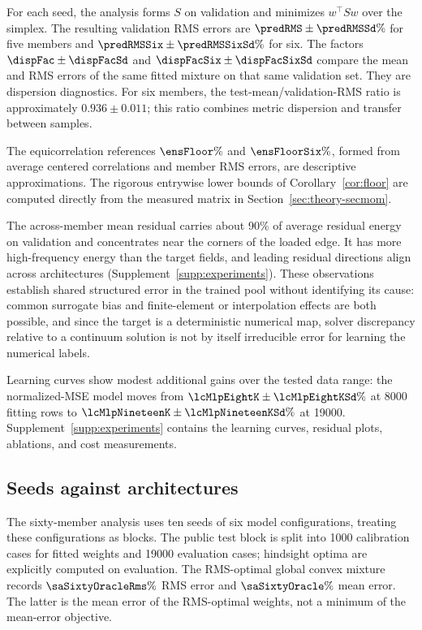 For each seed, the analysis forms $S$ on validation and minimizes $w^\top Sw$ over the simplex. The resulting validation RMS errors are $\predRMS\pm\predRMSSd\%$ for five members and $\predRMSSix\pm\predRMSSixSd\%$ for six. The factors $\dispFac\pm\dispFacSd$ and $\dispFacSix\pm\dispFacSixSd$ compare the mean and RMS errors of the same fitted mixture on that same validation set. They are dispersion diagnostics. For six members, the test-mean/validation-RMS ratio is approximately $0.936\pm0.011$; this ratio combines metric dispersion and transfer between samples.

The equicorrelation references $\ensFloor\%$ and $\ensFloorSix\%$, formed from average centered correlations and member RMS errors, are descriptive approximations. The rigorous entrywise lower bounds of Corollary~\ref{cor:floor} are computed directly from the measured matrix in Section~\ref{sec:theory-secmom}.

The across-member mean residual carries about 90\% of average residual energy on validation and concentrates near the corners of the loaded edge. It has more high-frequency energy than the target fields, and leading residual directions align across architectures (Supplement~\ref{supp:experiments}). These observations establish shared structured error in the trained pool without identifying its cause: common surrogate bias and finite-element or interpolation effects are both possible, and since the target is a deterministic numerical map, solver discrepancy relative to a continuum solution is not by itself irreducible error for learning the numerical labels.

Learning curves show modest additional gains over the tested data range: the normalized-MSE model moves from $\lcMlpEightK\pm\lcMlpEightKSd\%$ at 8000 fitting rows to $\lcMlpNineteenK\pm\lcMlpNineteenKSd\%$ at 19000. Supplement~\ref{supp:experiments} contains the learning curves, residual plots, ablations, and cost measurements.

\subsection{Seeds against architectures}
\label{sec:seeds-arch}
The sixty-member analysis uses ten seeds of six model configurations, treating these configurations as blocks. The public test block is split into 1000 calibration cases for fitted weights and 19000 evaluation cases; hindsight optima are explicitly computed on evaluation. The RMS-optimal global convex mixture records $\saSixtyOracleRms\%$ RMS error and $\saSixtyOracle\%$ mean error. The latter is the mean error of the RMS-optimal weights, not a minimum of the mean-error objective.

